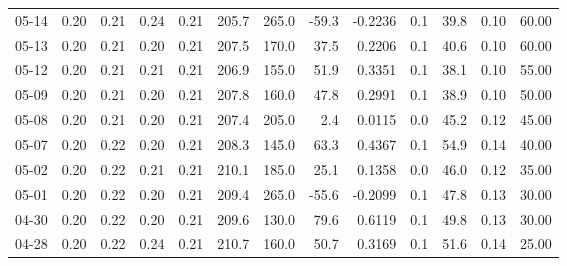 \begin{threeparttable}
{\begin{tabular}{lrrrrrrrrrrrr}
  05-14 &          0.20 &          0.21 &          0.24 &        0.21 &               205.7 &               265.0 &      -59.3 &      -0.2236 &                 0.1 &             39.8 &            0.10 &                  60.00 \\
  05-13 &          0.20 &          0.21 &          0.20 &        0.21 &               207.5 &               170.0 &       37.5 &       0.2206 &                 0.1 &             40.6 &            0.10 &                  60.00 \\
  05-12 &          0.20 &          0.21 &          0.21 &        0.21 &               206.9 &               155.0 &       51.9 &       0.3351 &                 0.1 &             38.1 &            0.10 &                  55.00 \\
  05-09 &          0.20 &          0.21 &          0.20 &        0.21 &               207.8 &               160.0 &       47.8 &       0.2991 &                 0.1 &             38.9 &            0.10 &                  50.00 \\
  05-08 &          0.20 &          0.21 &          0.20 &        0.21 &               207.4 &               205.0 &        2.4 &       0.0115 &                 0.0 &             45.2 &            0.12 &                  45.00 \\
  05-07 &          0.20 &          0.22 &          0.20 &        0.21 &               208.3 &               145.0 &       63.3 &       0.4367 &                 0.1 &             54.9 &            0.14 &                  40.00 \\
  05-02 &          0.20 &          0.22 &          0.21 &        0.21 &               210.1 &               185.0 &       25.1 &       0.1358 &                 0.0 &             46.0 &            0.12 &                  35.00 \\
  05-01 &          0.20 &          0.22 &          0.20 &        0.21 &               209.4 &               265.0 &      -55.6 &      -0.2099 &                 0.1 &             47.8 &            0.13 &                  30.00 \\
  04-30 &          0.20 &          0.22 &          0.20 &        0.21 &               209.6 &               130.0 &       79.6 &       0.6119 &                 0.1 &             49.8 &            0.13 &                  30.00 \\
  04-28 &          0.20 &          0.22 &          0.24 &        0.21 &               210.7 &               160.0 &       50.7 &       0.3169 &                 0.1 &             51.6 &            0.14 &                  25.00 \\

\end{tabular}}
\end{threeparttable}
